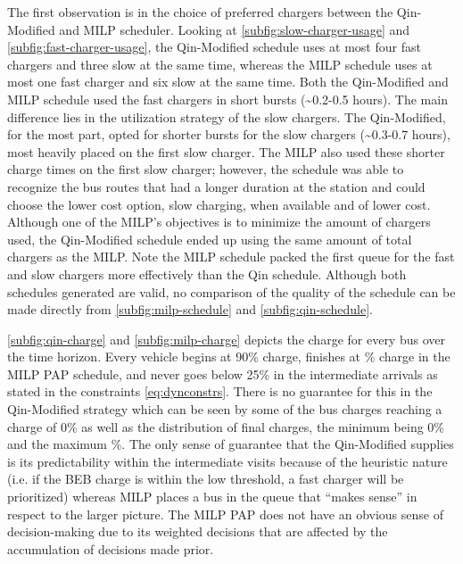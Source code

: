 \documentclass[utf8]{FrontiersinHarvard}
\newcommand{\bcharge}{0.7 }                                                     %
\newcommand{\mincharge}{25\% }                                                  %
\newcommand{\batsize}{388 }                                                     %
\begin{document}
The first observation is in the choice of preferred chargers between the Qin-Modified and MILP scheduler. Looking at
\autoref{subfig:slow-charger-usage} and \autoref{subfig:fast-charger-usage}, the Qin-Modified schedule uses at most four
fast chargers and three slow at the same time, whereas the MILP schedule uses at most one fast charger and six slow at
the same time. Both the Qin-Modified and MILP schedule used the fast chargers in short bursts (\textasciitilde{}0.2-0.5 hours). The main
difference lies in the utilization strategy of the slow chargers. The Qin-Modified, for the most part, opted for shorter
bursts for the slow chargers (\textasciitilde{}0.3-0.7 hours), most heavily placed on the first slow charger. The MILP also used these
shorter charge times on the first slow charger; however, the schedule was able to recognize the bus routes that had a
longer duration at the station and could choose the lower cost option, slow charging, when available and of lower cost.
Although one of the MILP's objectives is to minimize the amount of chargers used, the Qin-Modified schedule ended up
using the same amount of total chargers as the MILP. Note the MILP schedule packed the first queue for the fast and slow
chargers more effectively than the Qin schedule. Although both schedules generated are valid, no comparison of the
quality of the schedule can be made directly from \autoref{subfig:milp-schedule} and \autoref{subfig:qin-schedule}.

\autoref{subfig:qin-charge} and \autoref{subfig:milp-charge} depicts the charge for every bus over the time horizon.
Every vehicle begins at 90\% charge, finishes at \fpeval{\bcharge *100}\% charge in the MILP PAP schedule, and never goes
below \mincharge in the intermediate arrivals as stated in the constraints \autoref{eq:dynconstrs}. There is no
guarantee for this in the Qin-Modified strategy which can be seen by some of the bus charges reaching a charge of 0\% as
well as the distribution of final charges, the minimum being 0\% and the maximum  \fpeval{ trunc(\fpeval{368 /
\batsize * 100}, 3) }\%. The only sense of guarantee that the Qin-Modified supplies is its predictability within the
intermediate visits because of the heuristic nature (i.e. if the BEB charge is within the low threshold, a fast charger
will be prioritized) whereas MILP places a bus in the queue that ``makes sense'' in respect to the larger picture. The
MILP PAP does not have an obvious sense of decision-making due to its weighted decisions that are affected by the
accumulation of decisions made prior.
\end{document}
